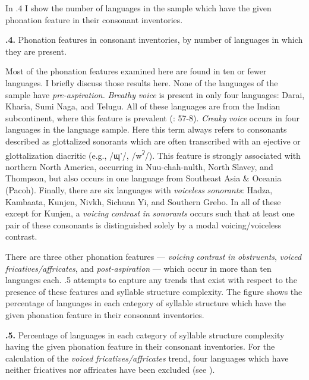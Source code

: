   In .4 I show the number of languages in the sample which have the given phonation feature in their consonant inventories.

\textbf{.4.} Phonation features in consonant inventories, by number of languages in which they are present.

  Most of the phonation features examined here are found in ten or fewer languages. I briefly discuss those results here. None of the languages of the sample have \textit{pre-aspiration.} \textit{Breathy} \textit{voice} is present in only four languages: Darai, Kharia, Sumi Naga, and Telugu. All of these languages are from the Indian subcontinent, where this feature is prevalent (\citealt{LadefogedMaddieson1996}: 57-8). \textit{Creaky} \textit{voice} occurs in four languages in the language sample. Here this term always refers to consonants described as glottalized sonorants which are often transcribed with an ejective or glottalization diacritic (e.g., /ɰ’/, /w\textsuperscript{ʔ}/). This feature is strongly associated with northern North America, occurring in Nuu-chah-nulth, North Slavey, and Thompson, but also occurs in one language from Southeast Asia \& Oceania (Pacoh). Finally, there are six languages with \textit{voiceless} \textit{sonorants}: Hadza, Kambaata, Kunjen, Nivkh, Sichuan Yi, and Southern Grebo. In all of these except for Kunjen, a \textit{voicing} \textit{contrast} \textit{in} \textit{sonorants} occurs such that at least one pair of these consonants is distinguished solely by a modal voicing/voiceless contrast.

  There are three other phonation features — \textit{voicing} \textit{contrast} \textit{in} \textit{obstruents}, \textit{voiced} \textit{fricatives/affricates}, and \textit{post-aspiration} — which occur in more than ten languages each. .5 attempts to capture any trends that exist with respect to the presence of these features and syllable structure complexity. The figure shows the percentage of languages in each category of syllable structure which have the given phonation feature in their consonant inventories.

\textbf{.5.} Percentage of languages in each category of syllable structure complexity having the given phonation feature in their consonant inventories. For the calculation of the \textit{voiced} \textit{fricatives/affricates} trend, four languages which have neither fricatives nor affricates have been excluded (see ).

